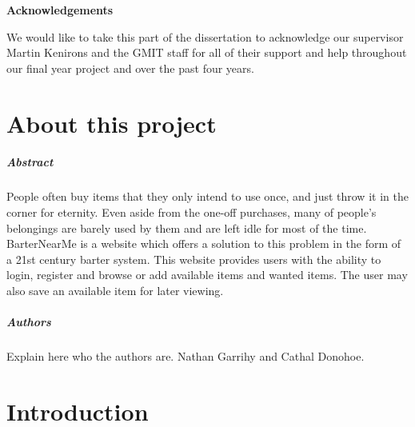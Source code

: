 \begin{titlepage}
   \begin{center}
       \vspace*{1cm}

       \textbf{Acknowledgements}
       \end{center}
       We would like to take this part of the dissertation to acknowledge our supervisor Martin Kenirons and the GMIT staff for all of their support and help throughout our final year project and over the past four years.
\end{titlepage}

\chapter*{About this project}
\paragraph{Abstract}
People often buy items that they only intend to use once, and just throw it in the corner for eternity. Even aside from the one-off purchases, many of people's belongings are barely used by them and are left idle for most of the time. BarterNearMe is a website which offers a solution to this problem in the form of a 21st century barter system. This website provides users with the ability to login, register and browse or add available items and wanted items. The user may also save an available item for later viewing. 

\paragraph{Authors}
Explain here who the authors are. Nathan Garrihy and Cathal Donohoe.



\chapter{Introduction}


